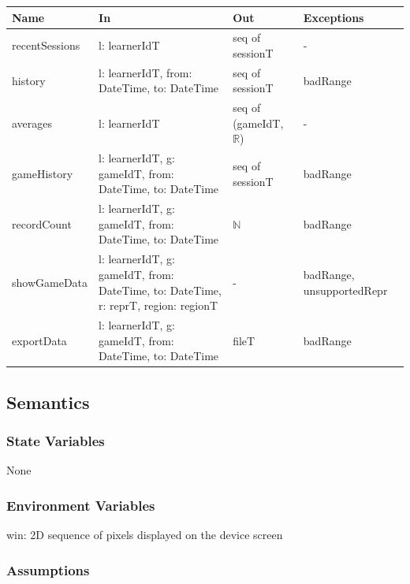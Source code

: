 \documentclass[12pt, titlepage]{article}
\begin{document}
\begin{center}
\small
\begin{tabular}{p{3.3cm} p{4.7cm} p{2.6cm} p{2.8cm}}
\hline
\textbf{Name} & \textbf{In} & \textbf{Out} & \textbf{Exceptions} \\
\hline
recentSessions & l: learnerIdT & seq of sessionT & - \\
history & l: learnerIdT, from: DateTime, to: DateTime & seq of sessionT & badRange \\
averages & l: learnerIdT & seq of (gameIdT, $\mathbb{R}$) & - \\
gameHistory & l: learnerIdT, g: gameIdT, from: DateTime, to: DateTime & seq of sessionT & badRange \\
recordCount & l: learnerIdT, g: gameIdT, from: DateTime, to: DateTime & $\mathbb{N}$ & badRange \\
showGameData & l: learnerIdT, g: gameIdT, from: DateTime, to: DateTime, r: reprT, region: regionT & - & badRange, unsupportedRepr \\
exportData & l: learnerIdT, g: gameIdT, from: DateTime, to: DateTime & fileT & badRange \\
\hline
\end{tabular}
\end{center}

\subsection{Semantics}

\subsubsection{State Variables}

None

\subsubsection{Environment Variables}

win: 2D sequence of pixels displayed on the device screen

\subsubsection{Assumptions}
\end{document}
